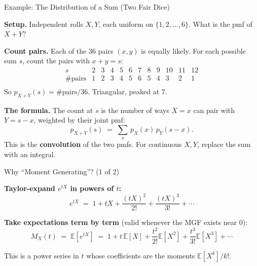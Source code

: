 \documentclass[aspectratio=169, handout, t]{beamer}
\numberwithin{equation}{section}
\begin{document}

\begin{frame}{Example: The Distribution of a Sum (Two Fair Dice)}

\textbf{Setup.} Independent rolls $X, Y$, each uniform on $\{1, 2, \ldots, 6\}$. What is the pmf of $X + Y$?

\pause

\medskip

\textbf{Count pairs.} Each of the $36$ pairs $(x, y)$ is equally likely. For each possible sum $s$, count the pairs with $x + y = s$:
\[
\begin{array}{c|ccccccccccc}
s & 2 & 3 & 4 & 5 & 6 & 7 & 8 & 9 & 10 & 11 & 12 \\\hline
\#\text{pairs} & 1 & 2 & 3 & 4 & 5 & 6 & 5 & 4 & 3 & 2 & 1 \\
\end{array}
\]
So $p_{X+Y}(s) = \#\text{pairs}/36$. Triangular, peaked at $7$.

\pause

\medskip

\textbf{The formula.} The count at $s$ is the number of ways $X = x$ can pair with $Y = s - x$, weighted by their joint pmf:
\[
p_{X+Y}(s) \;=\; \sum_x\, p_X(x)\,p_Y(s - x).
\]
This is the \textbf{convolution} of the two pmfs. For continuous $X, Y$, replace the sum with an integral.

\end{frame}


\begin{frame}{Why ``Moment Generating''? (1 of 2)}

\textbf{Taylor-expand $e^{tX}$ in powers of $t$:}
\[
e^{tX} \;=\; 1 + tX + \frac{(tX)^2}{2!} + \frac{(tX)^3}{3!} + \cdots
\]

\pause

\medskip

\textbf{Take expectations term by term} (valid whenever the MGF exists near $0$):
\[
M_X(t) \;=\; \mathbb{E}[e^{tX}] \;=\; 1 + t\,\mathbb{E}[X] + \frac{t^2}{2!}\mathbb{E}[X^2] + \frac{t^3}{3!}\mathbb{E}[X^3] + \cdots
\]

\pause

\medskip

This is a power series in $t$ whose coefficients are the moments $\mathbb{E}[X^k]/k!$.

\end{frame}
\end{document}
